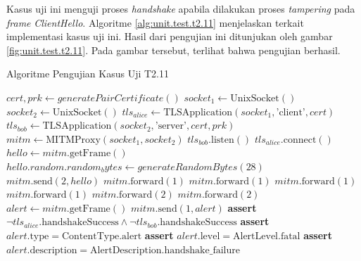 Kasus uji ini menguji proses \emph{handshake} apabila dilakukan proses \emph{tampering} pada \emph{frame} \emph{ClientHello}. Algoritme \ref{alg:unit.test.t2.11} menjelaskan terkait implementasi kasus uji ini. Hasil dari pengujian ini ditunjukan oleh gambar \ref{fig:unit.test.t2.11}. Pada gambar tersebut, terlihat bahwa pengujian berhasil.

\begin{algorithm}
  \caption{Algoritme Pengujian Kasus Uji T2.11}
  \label{alg:unit.test.t2.11}
  \begin{algorithmic}
    \State $cert, prk \gets generatePairCertificate()$
    \State $socket_1 \gets \text{UnixSocket}()$
    \State $socket_2 \gets \text{UnixSocket}()$
    \State $tls_{alice} \gets \text{TLSApplication}(socket_1, \text{'client'}, cert)$ 
    \State $tls_{bob} \gets \text{TLSApplication}(socket_2, \text{'server'}, cert, prk)$
    \State $mitm \gets \text{MITMProxy}(socket_1, socket_2)$
    \State
    \State $tls_{bob}.\text{listen}()$  
    \State $tls_{alice}.\text{connect}()$  
    \State
    \State $hello \gets mitm.\text{getFrame}()$ 
    \State $hello.random.random_bytes \gets generateRandomBytes(28)$
    \State $mitm.\text{send}(2, hello)$
    \State
    \State $mitm.\text{forward}(1)$ 
    \State $mitm.\text{forward}(1)$ 
    \State $mitm.\text{forward}(1)$ 
    \State $mitm.\text{forward}(1)$ 
    \State $mitm.\text{forward}(2)$ 
    \State $mitm.\text{forward}(2)$ 
    \State
    \State $alert \gets mitm.\text{getFrame}()$
    \State $mitm.\text{send}(1, alert)$
    \State
    \State \textbf{assert} $\lnot tls_{alice}.\text{handshakeSuccess} \land \lnot tls_{bob}.\text{handshakeSuccess}$
    \State \textbf{assert} $alert.\text{type} = \text{ContentType.alert}$
    \State \textbf{assert} $alert.\text{level} = \text{AlertLevel.fatal}$
    \State \textbf{assert} $alert.\text{description} = \text{AlertDescription.handshake\_failure}$
  \end{algorithmic}
\end{algorithm}

